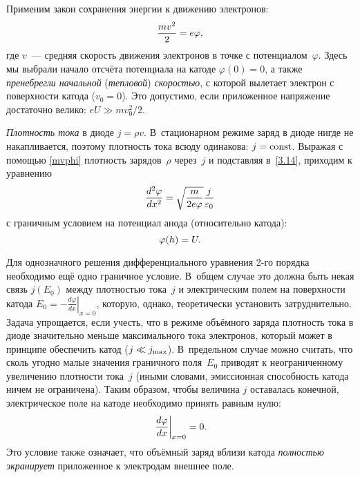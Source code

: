 Применим закон сохранения энергии к движению электронов:
\begin{equation}
\eqmark{mvphi}
    \frac{mv^2}{2}=e\varphi,
\end{equation}
где $v$~--- средняя скорость движения электронов в точке с потенциалом~$\varphi$.
Здесь мы выбрали начало отсчёта потенциала на катоде $\varphi(0)=0$, а также
\emph{пренебрегли начальной} (\emph{тепловой}) \emph{скоростью},
с которой вылетает электрон с поверхности катода ($v_0=0$). 
Это допустимо, если приложенное напряжение достаточно велико: $eU\gg mv_0^2/2$.

\emph{Плотность тока} в диоде $j=\rho v$. В~стационарном режиме заряд в диоде нигде не накапливается,
поэтому плотность тока всюду одинакова: $j=\mathrm{const}$.
Выражая с помощью \eqref{mvphi} плотность зарядов~$\rho$ через~$j$ 
и подставляя в~\eqref{3.14}, приходим к уравнению
\begin{equation}
    \eqmark{3.15}
    \frac{d^2\varphi}{dx^2}=\sqrt{\frac{m}{2e\varphi}} \frac{j}{\varepsilon_0}
\end{equation}
с граничным условием на потенциал анода (относительно катода):
\begin{equation}
\eqmark{bound1}
 \varphi(h) = U.
\end{equation}

Для однозначного решения дифференциального уравнения 2-го порядка 
необходимо ещё одно граничное условие. В~общем случае это должна 
быть некая связь $j(E_0)$ между плотностью тока~$j$ и электрическим 
полем на поверхности катода 
$E_0 = -\left.\frac{d\varphi}{dx}\right|_{x=0}$,
которую, однако, теоретически установить затруднительно.
Задача упрощается, если учесть, что в режиме объёмного заряда 
плотность тока в диоде значительно меньше максимального тока электронов, 
который может в принципе обеспечить катод ($j\ll j_{\rm max}$). 
В~предельном случае можно считать, что сколь угодно малые значения 
граничного поля~$E_0$ приводят 
к неограниченному увеличению плотности тока~$j$
(иными словами, эмиссионная способность катода ничем не ограничена). 
Таким образом, чтобы величина $j$ оставалась конечной, электрическое поле 
на катоде необходимо принять равным нулю:
\begin{equation}
\eqmark{bound2}
    \left.\frac{d\varphi}{dx}\right|_{x = 0}=0.
\end{equation}
Это условие также означает, что объёмный заряд вблизи катода 
\emph{полностью экранирует} приложенное к электродам внешнее поле.


